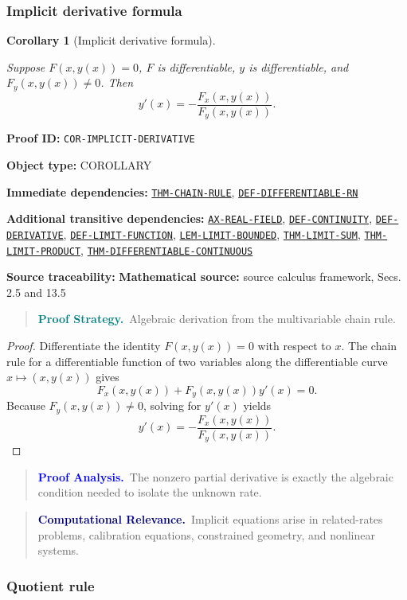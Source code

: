 \documentclass[10pt]{article}
\newcommand{\pidraw}[1]{\begingroup\urlstyle{tt}\nolinkurl{#1}\endgroup}
\newcommand{\pidref}[1]{\hyperref[prf:#1]{\pidraw{#1}}}
\newtheorem{corollary}[theorem]{Corollary}
\theoremstyle{definition}
\theoremstyle{remark}
\newenvironment{proofstrategy}
{\begin{quote}\small\noindent\textbf{\textcolor{teal}{Proof Strategy.}}\ }
{\end{quote}}
\newenvironment{proofanalysis}
{\begin{quote}\small\noindent\textbf{\textcolor{blue}{Proof Analysis.}}\ }
{\end{quote}}
\newenvironment{computationalrelevance}
{\begin{quote}\small\noindent\textbf{\textcolor{navy}{Computational Relevance.}}\ }
{\end{quote}}
\newcommand{\meta}[2]{\noindent\textbf{#1:} #2\par}
\begin{document}
\subsubsection{Implicit derivative formula}

\begin{corollary}[Implicit derivative formula]\label{prf:COR-IMPLICIT-DERIVATIVE}

Suppose $F(x,y(x))=0$, $F$ is differentiable, $y$ is differentiable, and
$F_y(x,y(x))\ne0$. Then
\[
y'(x)=-\frac{F_x(x,y(x))}{F_y(x,y(x))}.
\]

\end{corollary}

\meta{Proof ID}{\pidraw{COR-IMPLICIT-DERIVATIVE}}
\meta{Object type}{COROLLARY}
\meta{Immediate dependencies}{\pidref{THM-CHAIN-RULE}, \pidref{DEF-DIFFERENTIABLE-RN}}
\meta{Additional transitive dependencies}{\pidref{AX-REAL-FIELD}, \pidref{DEF-CONTINUITY}, \pidref{DEF-DERIVATIVE}, \pidref{DEF-LIMIT-FUNCTION}, \pidref{LEM-LIMIT-BOUNDED}, \pidref{THM-LIMIT-SUM}, \pidref{THM-LIMIT-PRODUCT}, \pidref{THM-DIFFERENTIABLE-CONTINUOUS}}
\meta{Source traceability}{\textbf{Mathematical source:} source calculus framework, Secs. 2.5 and 13.5}

\begin{proofstrategy}Algebraic derivation from the multivariable chain rule.\end{proofstrategy}

\begin{proof}

Differentiate the identity $F(x,y(x))=0$ with respect to $x$. The chain rule for
a differentiable function of two variables along the differentiable curve
$x\mapsto(x,y(x))$ gives
\[
F_x(x,y(x))+F_y(x,y(x))y'(x)=0.
\]
Because $F_y(x,y(x))\ne0$, solving for $y'(x)$ yields
\[
y'(x)=-\frac{F_x(x,y(x))}{F_y(x,y(x))}.
\]

\end{proof}

\begin{proofanalysis}The nonzero partial derivative is exactly the algebraic condition needed to isolate the unknown rate.\end{proofanalysis}

\begin{computationalrelevance}Implicit equations arise in related-rates problems, calibration equations, constrained geometry, and nonlinear systems.\end{computationalrelevance}

\subsubsection{Quotient rule}
\end{document}
